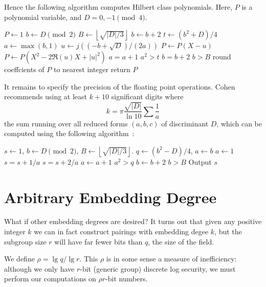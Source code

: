 Hence the following algorithm computes Hilbert class polynomials.
Here, $P$ is a polynomial variable, and $D = 0, -1 \pmod 4$.

\begin{algorithmic}[1]
\STATE $P\gets 1$
\STATE $b\gets D \pmod 2$
\STATE $B\gets \left\lfloor\sqrt{|D|/3}\right\rfloor$
\REPEAT
    \STATE $b\gets b+2$
    \STATE $t\gets (b^2+D)/4$
    \STATE $a\gets \max(b,1)$
    \REPEAT
	    \STATE $u\gets j((-b+\sqrt{D})/(2a))$
		\STATE $P \gets P(X-u)$
	    \ELSE
		\STATE $P \gets P(X^2 - 2\Re(u)X+|u|^2)$
	    \ENDIF
	\ENDIF
	\STATE $a=a+1$
    \UNTIL $a^2>t$
    \STATE $b=b+2$
\UNTIL $b>B$
\STATE round coeffcients of $P$ to nearest integer
\STATE return $P$

\end{algorithmic}

It remains to specify the precision of the floating point operations.
Cohen recommends using at least $k + 10$ significant digits where
\[ k = \pi \frac{\sqrt{|D|}} {\ln 10} \sum \frac{1}{a} \]
the sum running over all reduced forms $(a,b,c)$ of discriminant $D$,
which can be computed using the following algorithm~\cite[Algorithm 5.3.5]{1993-cohen}:

\begin{algorithmic}[1]
\STATE $s\gets 1$, $b\gets D \pmod 2$, $B\gets \left\lfloor \sqrt{|D|/3}
\right\rfloor$.
\REPEAT
    \REPEAT
	\STATE $q\gets (b^2 - D)/4$, $a\gets b$
	    \STATE $a\gets 1$
		\STATE $s=s+1/a$
	    \ELSE
		\STATE $s=s+2/a$
	    \ENDIF
	\ENDIF
	\STATE $a\gets a+1$
    \UNTIL $a^2>q$
    \STATE $b\gets b+2$
\UNTIL $b>B$
\STATE Output $s$
\end{algorithmic}

\section {Arbitrary Embedding Degree}

What if other embedding degrees are desired? It turns out that given any
positive integer $k$ we can in fact construct pairings with embedding degee $k$,
but the subgroup size $r$ will have far fewer bits than $q$,
the size of the field.

We define $\rho = \lg q / \lg r$. This $\rho$ is in some sense
a measure of inefficiency: although we only have $r$-bit (generic group)
discrete log security, we must perform our computations on $\rho r$-bit numbers.

